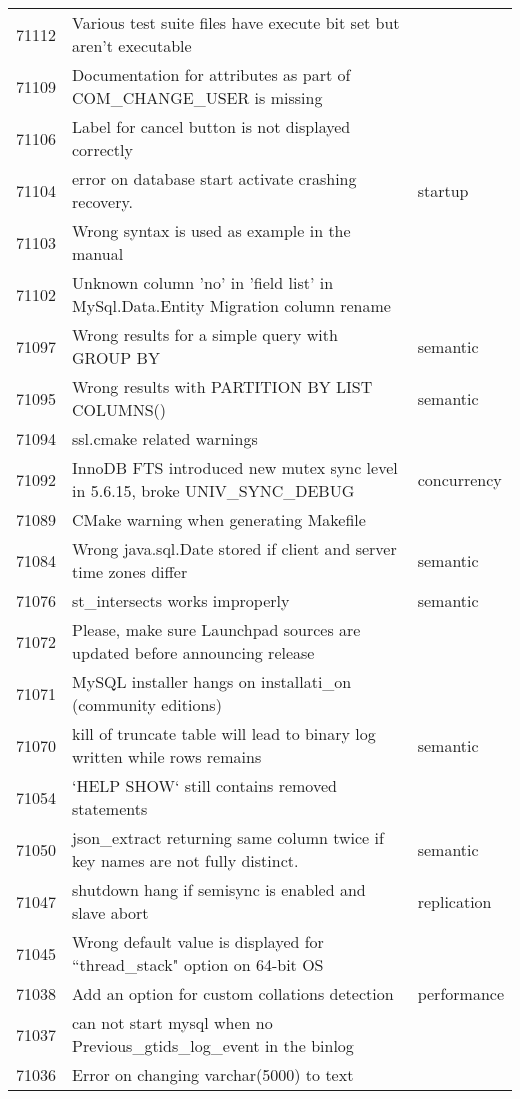\begin{longtable}[c]{p{1cm}p{10cm}p{1cm}}
71112 & Various test suite files have execute bit set but aren't executable &  \\
71109 & Documentation for attributes as part of COM\_CHANGE\_USER is missing &  \\
71106 & Label for cancel button is not displayed correctly &  \\
71104 & error on database start activate crashing recovery. & startup \\
71103 & Wrong syntax is used as example in the manual &  \\
71102 & Unknown column 'no' in 'field list' in MySql.Data.Entity Migration column rename &  \\
71097 & Wrong results for a simple query with GROUP BY & semantic \\
71095 & Wrong results with PARTITION BY LIST COLUMNS() & semantic \\
71094 & ssl.cmake related warnings &  \\
71092 & InnoDB FTS introduced new mutex sync level in 5.6.15, broke UNIV\_SYNC\_DEBUG & concurrency \\
71089 & CMake warning when generating Makefile &  \\
71084 & Wrong java.sql.Date stored if client and server time zones differ & semantic \\
71076 & st\_intersects works improperly & semantic \\
71072 & Please, make sure Launchpad sources are updated before announcing release &  \\
71071 & MySQL installer hangs on installati\_on (community editions) &  \\
71070 & kill of truncate table will lead to binary log written while rows remains & semantic \\
71054 & `HELP SHOW` still contains removed statements &  \\
71050 & json\_extract returning same column twice if key names are not fully distinct. & semantic \\
71047 & shutdown hang if semisync is enabled and slave abort & replication \\
71045 & Wrong default value is displayed for ``thread\_stack" option on 64-bit OS &  \\
71038 & Add an option for custom collations detection & performance \\
71037 & can not start mysql when no Previous\_gtids\_log\_event in the binlog &  \\
71036 & Error on changing varchar(5000) to text &  \\

\end{longtable}
